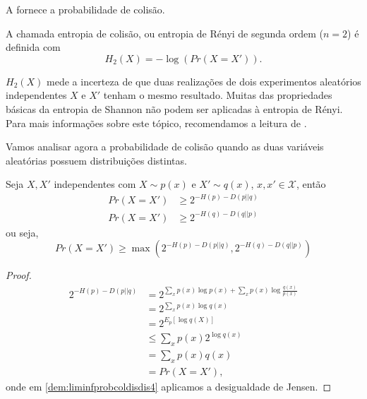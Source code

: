 A  fornece a probabilidade de colisão. 
\begin{definition}
A chamada entropia de colisão, ou entropia
de Rényi de segunda ordem ($n=2$) é definida com
\begin{equation}
  H_2(X) = -\log (Pr(X = X')) .
\end{equation}
\end{definition}
$H_2(X)$ mede a incerteza de que duas realizações de dois experimentos aleatórios independentes $X$ e $X'$
tenham o mesmo resultado. Muitas das propriedades básicas da entropia de Shannon não podem
ser aplicadas à entropia de Rényi. Para mais informações sobre este tópico,
recomendamos a leitura de \textcite{delfs2015}.


Vamos analisar agora a probabilidade de colisão quando as duas variáveis aleatórias possuem distribuições distintas.
\begin{corollary}
  Seja $X, X'$ independentes com $X \sim p(x)$ e $X' \sim q(x)$, $x,x' \in \mathcal{X}$, então
  \begin{subequations}
    \begin{align}
      Pr(X=X') &\geq 2^{-H(p) - D(p||q)} \\
      Pr(X=X') &\geq 2^{-H(q) - D(q||p)}
    \end{align}
  \end{subequations}
  ou seja,
  \begin{equation}
  Pr(X=X') \geq \max \left( 2^{-H(p) - D(p||q)} , 2^{-H(q)-D(q||p)} \right)
  \end{equation}
\end{corollary}
\begin{proof}
  \begin{subequations}\label{dem:liminfprobcoldisdis}
    \begin{align}
      2^{-H(p) - D(p||q)} &= 2^{\sum_x p(x) \log p(x) + \sum_x p(x) \log \frac{q(x)}{p(x)}} \label{dem:liminfprobcoldisdis1}\\
                &= 2^{\sum_x p(x) \log q(x)} \label{dem:liminfprobcoldisdis2}\\
                &= 2^{E_p[\log q(X)]} \label{dem:liminfprobcoldisdis3} \\
                &\leq \sum_x p(x) 2^{\log q(x)}  \label{dem:liminfprobcoldisdis4} \\
                &= \sum_x p(x) q(x) \label{dem:liminfprobcoldisdis5} \\
                &= Pr(X=X') ,\label{dem:liminfprobcoldisdis6}
    \end{align}
  \end{subequations}
  onde em \ref{dem:liminfprobcoldisdis4} aplicamos a desigualdade de Jensen.
\end{proof}






